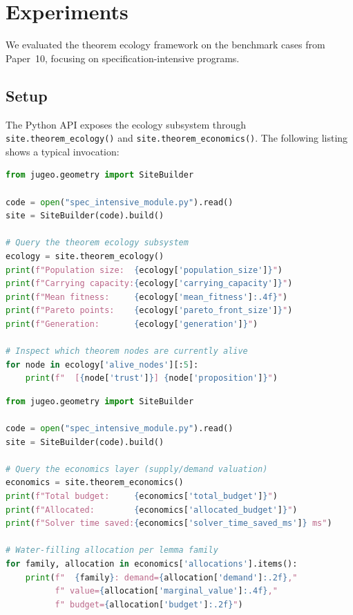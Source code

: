 \documentclass[11pt]{article}
\begin{document}
\section{Experiments}\label{sec:experiments}

We evaluated the theorem ecology framework on the \numcases{} benchmark
cases from Paper~10, focusing on \numspec{} specification-intensive
programs.

\subsection{Setup}

The Python API exposes the ecology subsystem through
\texttt{site.theorem\_ecology()} and \texttt{site.theorem\_economics()}.
The following listing shows a typical invocation:

\begin{lstlisting}[language=Python, caption={Initialising and inspecting a theorem ecology via the \JuGeo{} API.}]
from jugeo.geometry import SiteBuilder

code = open("spec_intensive_module.py").read()
site = SiteBuilder(code).build()

# Query the theorem ecology subsystem
ecology = site.theorem_ecology()
print(f"Population size:  {ecology['population_size']}")
print(f"Carrying capacity:{ecology['carrying_capacity']}")
print(f"Mean fitness:     {ecology['mean_fitness']:.4f}")
print(f"Pareto points:    {ecology['pareto_front_size']}")
print(f"Generation:       {ecology['generation']}")

# Inspect which theorem nodes are currently alive
for node in ecology['alive_nodes'][:5]:
    print(f"  [{node['trust']}] {node['proposition']}")
\end{lstlisting}

\begin{lstlisting}[language=Python, caption={Querying the theorem economics layer for budget allocation.}]
from jugeo.geometry import SiteBuilder

code = open("spec_intensive_module.py").read()
site = SiteBuilder(code).build()

# Query the economics layer (supply/demand valuation)
economics = site.theorem_economics()
print(f"Total budget:     {economics['total_budget']}")
print(f"Allocated:        {economics['allocated_budget']}")
print(f"Solver time saved:{economics['solver_time_saved_ms']} ms")

# Water-filling allocation per lemma family
for family, allocation in economics['allocations'].items():
    print(f"  {family}: demand={allocation['demand']:.2f},"
          f" value={allocation['marginal_value']:.4f},"
          f" budget={allocation['budget']:.2f}")
\end{lstlisting}
\end{document}
